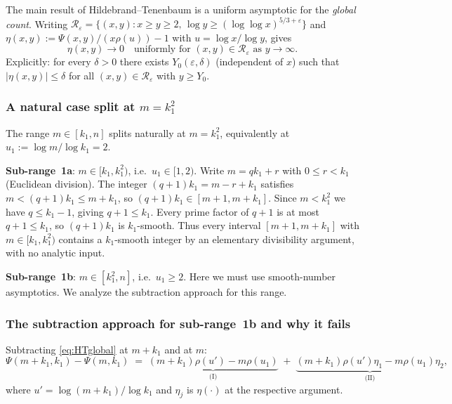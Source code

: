 \documentclass[12pt]{article}
\theoremstyle{definition}
\begin{document}
The main result of Hildebrand--Tenenbaum \cite{HT} is a uniform asymptotic
for the \emph{global count}.  Writing
$\mathcal{R}_\varepsilon = \{(x,y) : x \geq y \geq 2,\, \log y \geq (\log\log x)^{5/3+\varepsilon}\}$
and $\eta(x,y) := \Psi(x,y)/(x\rho(u)) - 1$ with $u = \log x/\log y$,
\cite[Th\'eor\`eme~1]{HT} gives
\begin{equation}\label{eq:HTglobal}
  \eta(x,y) \to 0 \quad\text{uniformly for }(x,y)\in\mathcal{R}_\varepsilon
  \text{ as }y\to\infty.
\end{equation}
Explicitly: for every $\delta > 0$ there exists $Y_0(\varepsilon,\delta)$
(independent of $x$) such that $|\eta(x,y)| \leq \delta$ for all
$(x,y)\in\mathcal{R}_\varepsilon$ with $y \geq Y_0$.

\subsubsection*{A natural case split at $m = k_1^2$}

The range $m \in [k_1, n]$ splits naturally at $m = k_1^2$,
equivalently at $u_1 := \log m/\log k_1 = 2$.

\noindent\textbf{Sub-range~1a}: $m \in [k_1, k_1^2)$, i.e.\ $u_1 \in [1,2)$.
Write $m = qk_1 + r$ with $0 \leq r < k_1$ (Euclidean division).
The integer $(q+1)k_1 = m - r + k_1$ satisfies $m < (q+1)k_1 \leq m + k_1$,
so $(q+1)k_1 \in [m+1, m+k_1]$.
Since $m < k_1^2$ we have $q \leq k_1 - 1$, giving $q+1 \leq k_1$.
Every prime factor of $q+1$ is at most $q+1 \leq k_1$, so $(q+1)k_1$ is $k_1$-smooth.
Thus every interval $[m+1, m+k_1]$ with $m \in [k_1, k_1^2)$
contains a $k_1$-smooth integer by an elementary divisibility argument,
with no analytic input.

\noindent\textbf{Sub-range~1b}: $m \in [k_1^2, n]$, i.e.\ $u_1 \geq 2$.
Here we must use smooth-number asymptotics.
We analyze the subtraction approach for this range.

\subsubsection*{The subtraction approach for sub-range~1b and why it fails}

Subtracting \eqref{eq:HTglobal} at $m + k_1$ and at $m$:
\begin{equation}\label{eq:diff}
  \Psi(m+k_1,k_1) - \Psi(m,k_1)
  \;=\; \underbrace{(m+k_1)\rho(u') - m\rho(u_1)}_{\text{(I)}}
  \;+\; \underbrace{(m+k_1)\rho(u')\eta_1 - m\rho(u_1)\eta_2}_{\text{(II)}},
\end{equation}
where $u' = \log(m+k_1)/\log k_1$ and $\eta_j$ is $\eta(\cdot)$ at the
respective argument.
\end{document}
